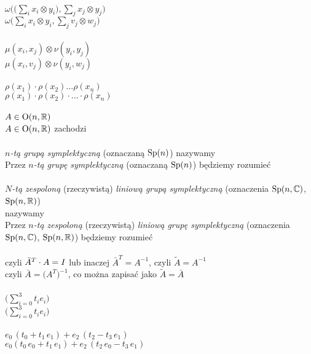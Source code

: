 \documentclass[a4paper,11pt]{article}
\begin{document}
\vspace{\spaceTwo}


\noindent
{} \\
\Jest  $\displaystyle \omega\Big( \big( \sum_{ i } x_{ i } \otimes y_{ i } ),
\sum_{ j } x_{ j } \otimes y_{ j } )$ \\
\Powin $\displaystyle \omega\Big( \sum_{ i } x_{ i } \otimes y_{ i },
\sum_{ j } v_{ j } \otimes w_{ j } \Big)$ \\
 \\
\Jest  $\displaystyle \mu( x_{ i }, x_{ j } ) \otimes \nu( y_{ i }, y_{ j } )$ \\
\Powin $\displaystyle \mu( x_{ i }, v_{ j } ) \otimes \nu( y_{ i }, w_{ j } )$ \\
 \\
\Jest  $\rho( x_{ 1 } ) \cdot \rho( x_{ 2 } ) \ldots \rho( x_{ n } )$ \\
\Powin $\rho( x_{ 1 } ) \cdot \rho( x_{ 2 } ) \cdot \ldots \cdot \rho( x_{ n } )$ \\
 \\
\Jest  $A \in \mathbf{\mathrm{O}}( n, \mathbb{R} )$ \\
\Powin $A \in \mathbf{\mathrm{O}}( n, \mathbb{R} )$ zachodzi \\
 \\
\Jest  \textit{$n$-tą grupą symplektyczną} (oznaczaną $\mathrm{Sp}( n )$)
nazywamy \\
\Powin Przez \textit{$n$-tą grupę symplektyczną} (oznaczaną $\mathrm{Sp}( n )$)
będziemy rozumieć \\
 \\
\Jest  \textit{$N$-tą zespoloną} (rzeczywistą) \textit{liniową grupą
  symplektyczną} (oznaczenia $\mathrm{Sp}( n, \mathbb{C} )$, $\mathrm{Sp}( n, \mathbb{R} )$) \\
nazywamy \\
\Powin Przez \textit{$n$-tą zespoloną} (rzeczywistą) \textit{liniową grupę
  symplektyczną} (oznaczenia $\mathrm{Sp}( n, \mathbb{C} )$, $\mathrm{Sp}( n, \mathbb{R} )$) będziemy
rozumieć \\
 \\
\Jest  czyli $\bar{A}^{ T } \cdot A = I$ lub inaczej
$\bar{A}^{ T } = A^{ -1 }$, czyli $\widetilde{A} = A^{ -1 }$ \\[0.5em]
\Powin czyli $\bar{A} = \Big( A^{ T } \Big)^{ -1 }$, co można zapisać jako
$\widetilde{A} = \bar{A}$ \\
 \\[0.5em]
\Jest  $\displaystyle \big( \sum_{ i = 0 }^{ 3 } t_{ i } e_{ i } )$ \\
\Powin $\displaystyle \big( \sum_{ i = 0 }^{ 3 } t_{ i } e _{ i } \big)$ \\[0.5em]
 \\
\Jest  $e_{ 0 } \, ( t_{ 0 } + t_{ 1 } \, e_{ 1 } )
+ e_{ 2 } \, ( t_{ 2 } - t_{ 3 } \, e_{ 1 } )$ \\[0.5em]
\Powin $e_{ 0 } ( t_{ 0 } \, e_{ 0 } + t_{ 1 } \, e_{ 1 } )
+ e_{ 2 } \, ( t_{ 2 } \, e_{ 0 } - t_{ 3 } \, e_{ 1 } )$ \\
\end{document}
